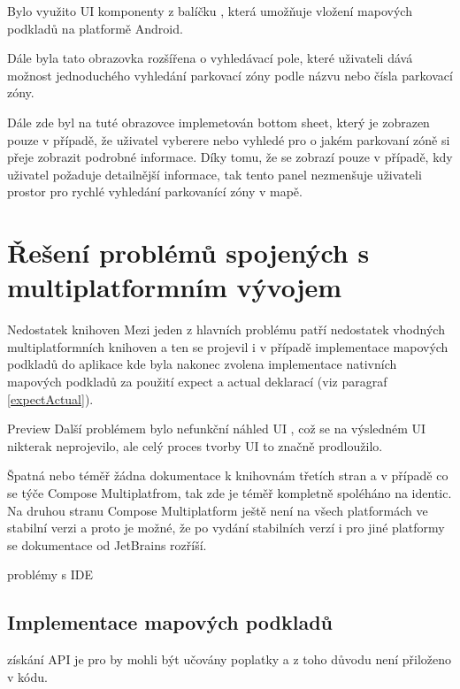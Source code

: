 Bylo využito UI komponenty  z balíčku , která umožňuje vložení mapových podkladů 
na platformě Android.

Dále byla tato obrazovka rozšířena o vyhledávací pole, které uživateli dává možnost jednoduchého vyhledání parkovací zóny podle názvu nebo čísla 
parkovací zóny.



Dále zde byl na tuté obrazovce implemetován bottom sheet, který je zobrazen pouze v případě, že uživatel vyberere nebo vyhledé pro o jakém 
parkovaní zóně si přeje zobrazit podrobné informace. Díky tomu, že se zobrazí pouze v případě, kdy uživatel požaduje detailnější informace, tak
tento panel nezmenšuje uživateli prostor pro rychlé vyhledání parkovanící zóny v mapě. 



\section{Řešení problémů spojených s multiplatformním vývojem}
Nedostatek knihoven
Mezi jeden z hlavních problému patří nedostatek vhodných multiplatformních knihoven a ten se projevil i v případě implementace mapových podkladů
do aplikace kde byla nakonec zvolena implementace nativních mapových podkladů za použití expect a actual deklarací (viz paragraf \ref{expectActual}).

Preview
Další problémem bylo nefunkční náhled UI , což se na výsledném UI nikterak neprojevilo, ale celý proces tvorby UI to značně prodloužilo.

Špatná nebo téměř žádna dokumentace k knihovnám třetích stran a v případě co se týče Compose Multiplatfrom, tak zde je téměř kompletně spoléháno na
identic. 
Na druhou stranu Compose Multiplatform ještě není na všech platformách ve stabilní verzi a proto je možné, že po vydání stabilních verzí i pro jiné
platformy se dokumentace od JetBrains rozříší.

problémy s IDE 


\subsection{Implementace mapových podkladů}

získání API je pro by mohli být učovány poplatky a z toho důvodu není přiloženo v kódu.  

